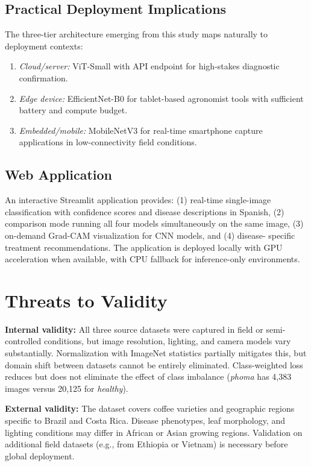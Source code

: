 \documentclass[conference]{IEEEtran}
\begin{document}
\subsection{Practical Deployment Implications}

The three-tier architecture emerging from this study maps naturally to
deployment contexts:

\begin{enumerate}
  \item \textit{Cloud/server:} ViT-Small with API endpoint for high-stakes
    diagnostic confirmation.
  \item \textit{Edge device:} EfficientNet-B0 for tablet-based agronomist
    tools with sufficient battery and compute budget.
  \item \textit{Embedded/mobile:} MobileNetV3 for real-time smartphone
    capture applications in low-connectivity field conditions.
\end{enumerate}

\subsection{Web Application}

An interactive Streamlit application provides: (1) real-time single-image
classification with confidence scores and disease descriptions in Spanish,
(2) comparison mode running all four models simultaneously on the same
image, (3) on-demand Grad-CAM visualization for CNN models, and (4) disease-
specific treatment recommendations. The application is deployed locally with
GPU acceleration when available, with CPU fallback for inference-only
environments.

\section{Threats to Validity}

\textbf{Internal validity:} All three source datasets were captured in field
or semi-controlled conditions, but image resolution, lighting, and camera
models vary substantially. Normalization with ImageNet statistics partially
mitigates this, but domain shift between datasets cannot be entirely
eliminated. Class-weighted loss reduces but does not eliminate the effect of
class imbalance (\textit{phoma} has 4{,}383 images versus 20{,}125 for
\textit{healthy}).

\textbf{External validity:} The dataset covers coffee varieties and
geographic regions specific to Brazil and Costa Rica. Disease phenotypes,
leaf morphology, and lighting conditions may differ in African or Asian
growing regions. Validation on additional field datasets (e.g., from
Ethiopia or Vietnam) is necessary before global deployment.
\end{document}
